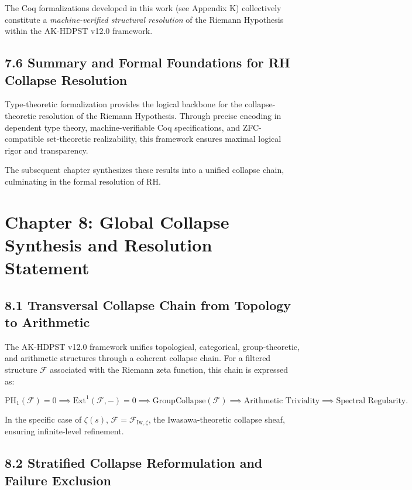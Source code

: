 \documentclass[11pt]{article}
\begin{document}
The Coq formalizations developed in this work (see Appendix K) collectively constitute a \textit{machine-verified structural resolution} of the Riemann Hypothesis within the AK-HDPST v12.0 framework.

\subsection*{7.6 Summary and Formal Foundations for RH Collapse Resolution}

Type-theoretic formalization provides the logical backbone for the collapse-theoretic resolution of the Riemann Hypothesis. Through precise encoding in dependent type theory, machine-verifiable Coq specifications, and ZFC-compatible set-theoretic realizability, this framework ensures maximal logical rigor and transparency.

The subsequent chapter synthesizes these results into a unified collapse chain, culminating in the formal resolution of RH.



\section{Chapter 8: Global Collapse Synthesis and Resolution Statement}

\subsection*{8.1 Transversal Collapse Chain from Topology to Arithmetic}

The AK-HDPST v12.0 framework unifies topological, categorical, group-theoretic, and arithmetic structures through a coherent collapse chain. For a filtered structure $\mathcal{F}$ associated with the Riemann zeta function, this chain is expressed as:

\[
\mathrm{PH}_1(\mathcal{F}) = 0 \implies \mathrm{Ext}^1(\mathcal{F}, -) = 0 \implies \mathrm{GroupCollapse}(\mathcal{F}) \implies \text{Arithmetic Triviality} \implies \text{Spectral Regularity}.
\]

In the specific case of $\zeta(s)$, $\mathcal{F} = \mathcal{F}_{\mathrm{Iw}, \zeta}$, the Iwasawa-theoretic collapse sheaf, ensuring infinite-level refinement.

\subsection*{8.2 Stratified Collapse Reformulation and Failure Exclusion}
\end{document}
